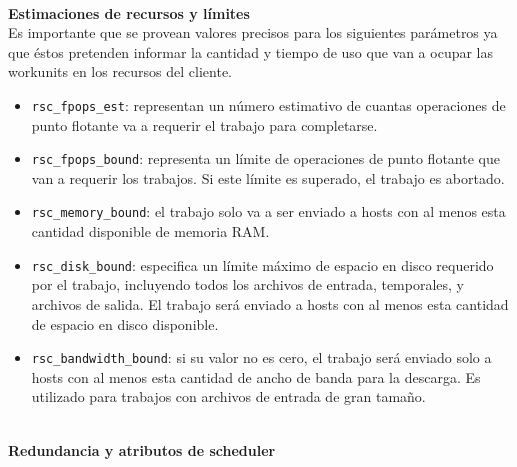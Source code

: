 \textbf{\\Estimaciones de recursos y límites}\\


Es importante que se provean valores precisos para los siguientes parámetros ya que éstos pretenden informar la cantidad y tiempo de uso que van a ocupar las workunits en los recursos del cliente.

\begin{itemize}
\item \texttt{rsc\_fpops\_est}: representan un número estimativo de cuantas operaciones de punto flotante va a requerir el trabajo para completarse. 
\item \texttt{rsc\_fpops\_bound}: representa un límite de operaciones de punto flotante que van a requerir los trabajos. Si este límite es superado, el trabajo es abortado.
\item \texttt{rsc\_memory\_bound}: el trabajo solo va a ser enviado a hosts con al menos esta cantidad disponible de memoria RAM. 
\item \texttt{rsc\_disk\_bound}: especifica un límite máximo de espacio en disco requerido por el trabajo, incluyendo todos los archivos de entrada, temporales, y archivos de salida. El trabajo será enviado a hosts con al menos esta cantidad de espacio en disco disponible.
\item \texttt{rsc\_bandwidth\_bound}:  si su valor no es cero, el trabajo será enviado solo a hosts con al menos esta cantidad de ancho de banda para la descarga. Es utilizado para trabajos con archivos de entrada de gran tamaño.
\end{itemize}

\textbf{\\Redundancia y atributos de scheduler}\\

